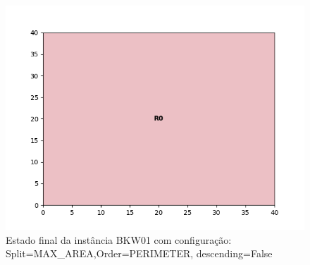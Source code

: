 \begin{figure}[H]
    \centering
    \caption[]{Estado final da instância BKW01 com configuração: Split=MAX_AREA,Order=PERIMETER, descending=False}
    \label{fig:bkw01-max_area-perimeter-false}
    \includegraphics[scale=0.5]{output/figures/bkw/bkw01/max_area/perimeter/false/00}
\end{figure}